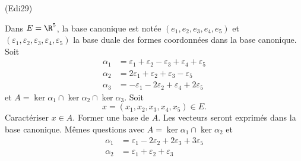 \begin{tiny}(Edi29)\end{tiny} Dans $E = \R^5$, la base canonique est notée $(e_1,e_2,e_3,e_4,e_5)$ et $(\varepsilon_1,\varepsilon_2,\varepsilon_3,\varepsilon_4,\varepsilon_5)$ la base duale des formes coordonnées dans la base canonique. Soit
\[
 \begin{aligned}
  \alpha_1 &= \varepsilon_1 + \varepsilon_2 - \varepsilon_3 + \varepsilon_4 + \varepsilon_5 \\
  \alpha_2 &= 2\varepsilon_1 + \varepsilon_2 + \varepsilon_3 - \varepsilon_5 \\
  \alpha_3 &= -\varepsilon_1 - 2\varepsilon_2 + \varepsilon_4 + 2\varepsilon_5
 \end{aligned}
\]
et $A = \ker \alpha_1 \cap \ker \alpha_2 \cap  \ker \alpha_3$. Soit
\[
 x = (x_1,x_2,x_3,x_4,x_5) \in E.
\]
Caractériser $x\in A$. Former une base de $A$. Les vecteurs seront exprimés dans la base canonique.\newline
Mêmes questions avec $A= \ker \alpha_1 \cap \ker \alpha_2$ et
\[
 \begin{aligned}
  \alpha_1 &= \varepsilon_1 -2 \varepsilon_2 + 2\varepsilon_3 + 3\varepsilon_5 \\
  \alpha_2 &= \varepsilon_1 + \varepsilon_2 + \varepsilon_3
 \end{aligned}
\]
